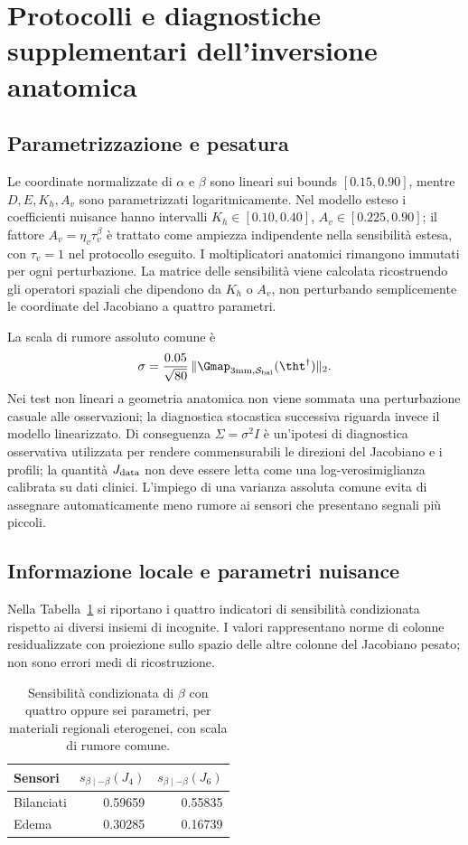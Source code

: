 \section{Protocolli e diagnostiche supplementari dell'inversione anatomica}\label{app:inverse}
\subsection*{Parametrizzazione e pesatura}
Le coordinate normalizzate di $\alpha$ e $\beta$ sono lineari sui bounds $[0.15,0.90]$, mentre $D,E,K_h,A_v$ sono parametrizzati logaritmicamente. Nel modello esteso i coefficienti nuisance hanno intervalli $K_h\in[0.10,0.40]$, $A_v\in[0.225,0.90]$; il fattore $A_v=\eta_v\tau_v^\beta$ \`e trattato come ampiezza indipendente nella sensibilit\`a estesa, con $\tau_v=1$ nel protocollo eseguito. I moltiplicatori anatomici rimangono immutati per ogni perturbazione. La matrice delle sensibilit\`a viene calcolata ricostruendo gli operatori spaziali che dipendono da $K_h$ o $A_v$, non perturbando semplicemente le coordinate del Jacobiano a quattro parametri.

La scala di rumore assoluto comune \`e
\begin{equation}\label{eq:app-noise-sigma}
\sigma=\frac{0.05}{\sqrt{80}}\,
\|\Gmap_{3\mathrm{mm},\mathcal S_{\rm bal}}(\tht^\dagger)\|_2.
\end{equation}
Nei test non lineari a geometria anatomica non viene sommata una perturbazione casuale alle osservazioni; la diagnostica stocastica successiva riguarda invece il modello linearizzato. Di conseguenza $\Sigma=\sigma^2I$ \`e un'ipotesi di diagnostica osservativa utilizzata per rendere commensurabili le direzioni del Jacobiano e i profili; la quantit\`a $J_{\rm data}$ non deve essere letta come una log-verosimiglianza calibrata su dati clinici. L'impiego di una varianza assoluta comune evita di assegnare automaticamente meno rumore ai sensori che presentano segnali pi\`u piccoli.

\subsection*{Informazione locale e parametri nuisance}
Nella Tabella~\ref{tab:app-six-local} si riportano i quattro indicatori di sensibilit\`a condizionata rispetto ai diversi insiemi di incognite. I valori rappresentano norme di colonne residualizzate con proiezione sullo spazio delle altre colonne del Jacobiano pesato; non sono errori medi di ricostruzione.
\begin{table}[H]
\centering\caption{Sensibilit\`a condizionata di $\beta$ con quattro oppure sei parametri, per materiali regionali eterogenei, con scala di rumore comune.}\label{tab:app-six-local}
\small\setlength{\tabcolsep}{4pt}
\begin{tabular}{@{}lrr@{}}\toprule
Sensori&$s_{\beta\mid-\beta}(J_4)$&$s_{\beta\mid-\beta}(J_6)$\\\midrule
Bilanciati&0.59659&0.55835\\
Edema&0.30285&0.16739\\\bottomrule
\end{tabular}
\end{table}

